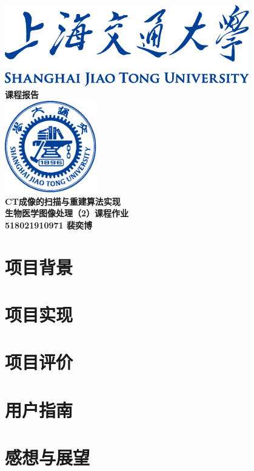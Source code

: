 \documentclass[UTF8]{ctexart}
\begin{document}
\begin{titlepage}
    \begin{center}
        \includegraphics[width=0.8\textwidth]{sjtu-name-blue.pdf}\\[1cm]
        \textsc{\Huge \bfseries 课程报告}\\[1.5cm]
        \includegraphics[width=0.3\textwidth]{sjtu-badge-blue.pdf}\\[0.5cm]    

        \Huge \bfseries{CT成像的扫描与重建算法实现}\\[1cm]
        \LARGE \bfseries{生物医学图像处理（2）课程作业}\\[1cm]
        \Large \bfseries{518021910971 裴奕博}
    \end{center}
\end{titlepage}
\tableofcontents
\newpage


\section{项目背景}

\section{项目实现}

\section{项目评价}

\section{用户指南}

\section{感想与展望}
\end{document}

